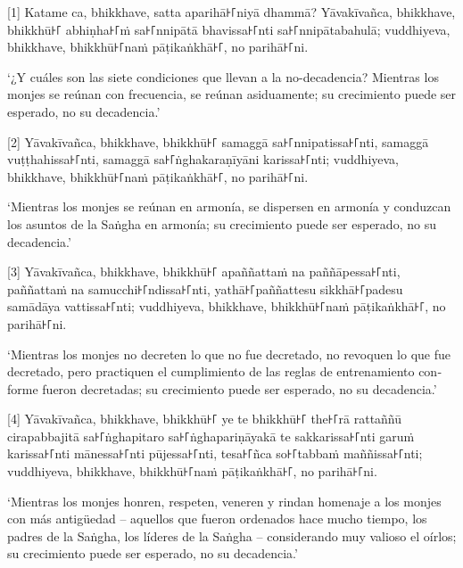[1] Katame ca, bhikkhave, satta aparihā꜔꜒niyā dhammā? Yāvakīvañca, bhikkhave, bhikkhū꜔꜒
abhiṇha꜔꜒ṁ sa꜔꜒nnipātā bhavissa꜔꜒nti sa꜔꜒nnipātabahulā; vuddhiyeva, bhikkhave,
bhikkhū꜔꜒naṁ pāṭikaṅkhā꜔꜒, no parihā꜔꜒ni.

\begin{english}
  ‘¿Y cuáles son las siete condiciones que llevan a la no-decadencia? Mientras los monjes
  se reúnan con frecuencia, se reúnan asiduamente; su crecimiento puede ser esperado, no su decadencia.’

\end{english}

[2] Yāvakīvañca, bhikkhave, bhikkhū꜔꜒ samaggā sa꜔꜒nnipatissa꜔꜒nti, samaggā
vuṭṭhahissa꜔꜒nti, samaggā sa꜔꜒ṅghakaraṇīyāni karissa꜔꜒nti; vuddhiyeva, bhikkhave,
bhikkhū꜔꜒naṁ pāṭikaṅkhā꜔꜒, no parihā꜔꜒ni.

\begin{english}
  ‘Mientras los monjes se reúnan en armonía, se dispersen en armonía y conduzcan los asuntos de la Saṅgha en armonía; su crecimiento puede ser
  esperado, no su decadencia.’
\end{english}

[3] Yāvakīvañca, bhikkhave, bhikkhū꜔꜒ apaññattaṁ na paññāpessa꜔꜒nti, paññattaṁ na
samucchi꜔꜒ndissa꜔꜒nti, yathā꜔꜒paññattesu sikkhā꜔꜒padesu samādāya vattissa꜔꜒nti;
vuddhiyeva, bhikkhave, bhikkhū꜔꜒naṁ pāṭikaṅkhā꜔꜒, no parihā꜔꜒ni.

\begin{english}
  ‘Mientras los monjes no decreten lo que no fue decretado, no revoquen lo que
  fue decretado, pero practiquen el cumplimiento de las reglas de entrenamiento conforme
  fueron decretadas; su crecimiento puede ser
  esperado, no su decadencia.’
\end{english}

[4] Yāvakīvañca, bhikkhave, bhikkhū꜔꜒ ye te bhikkhū꜔꜒ the꜔꜒rā rattaññū cirapabbajitā
sa꜔꜒ṅghapitaro sa꜔꜒ṅghapariṇāyakā te sakkarissa꜔꜒nti garuṁ karissa꜔꜒nti mānessa꜔꜒nti
pūjessa꜔꜒nti, tesa꜔꜒ñca so꜔꜒tabbaṁ maññissa꜔꜒nti; vuddhiyeva, bhikkhave, bhikkhū꜔꜒naṁ
pāṭikaṅkhā꜔꜒, no parihā꜔꜒ni.

\begin{english}
  ‘Mientras los monjes honren, respeten, veneren y rindan homenaje a los
  monjes con más antigüedad  -- aquellos que fueron ordenados hace mucho tiempo, los padres de la Saṅgha, los líderes de la Saṅgha -- considerando muy valioso el oírlos; su crecimiento puede ser
  esperado, no su decadencia.’
\end{english}

